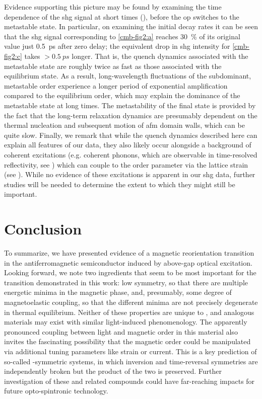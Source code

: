 Evidence supporting this picture may be found by examining the time dependence of the \gls{shg} signal at short times (), before the \gls{op} switches to the metastable state.
In particular, on examining the initial decay rates it can be seen that the \gls{shg} signal corresponding to \cref{cmb-fig2:a} reaches \qty{30}{\percent} of its original value just \qty{0.5}{ps} after zero delay; the equivalent drop in \gls{shg} intensity for \cref{cmb-fig2:c} takes $> \qty{0.5}{ps}$ longer.
That is, the quench dynamics associated with the metastable state are roughly twice as fast as those associated with the equilibrium state.
As a result, long-wavelength fluctuations of the subdominant, metastable order experience a longer period of exponential amplification compared to the equilibrium order, which may explain the dominance of the metastable state at long times.
The metastability of the final state is provided by the fact that the long-term relaxation dynamics are presumably dependent on the thermal nucleation and subsequent motion of \gls{afm} domain walls, which can be quite slow\citep{parkin_memory_2015,kim_real-space_2022}.
Finally, we remark that while the quench dynamics described here can explain all features of our data, they also likely occur alongside a background of coherent excitations (e.g. coherent phonons, which are observable in time-resolved reflectivity, see ) which can couple to the order parameter via the lattice strain (see ).
While no evidence of these excitations is apparent in our \gls{shg} data, further studies will be needed to determine the extent to which they might still be important.

\section{Conclusion}

To summarize, we have presented evidence of a magnetic reorientation transition in the antiferromagnetic semiconductor \cmb induced by above-gap optical excitation.
Looking forward, we note two ingredients that seem to be most important for the transition demonstrated in this work: low symmetry, so that there are multiple energetic minima in the magnetic phase, and, presumably, some degree of magnetoelastic coupling, so that the different minima are not precisely degenerate in thermal equilibrium.
Neither of these properties are unique to \cmb, and analogous materials may exist with similar light-induced phenomenology. 
The apparently pronounced coupling between light and magnetic order in this material also invites the fascinating possibility that the magnetic order could be manipulated via additional tuning parameters like strain or current.
This is a key prediction of so-called \pt-symmetric systems, in which inversion and time-reversal symmetries are independently broken but the product of the two is preserved\citep{watanabe_group-theoretical_2018, watanabe_nonlinear_2020, watanabe_symmetry_2018}.
Further investigation of these and related compounds could have far-reaching impacts for future opto-spintronic technology.

